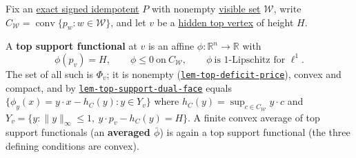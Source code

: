 \hypertarget{def:top-support-functional}{}%
\begin{definition}\label{def:top-support-functional}
Fix an \hyperref[def:signed-idempotent]{exact signed idempotent} $P$ with nonempty
\hyperref[def:visible-set]{visible set} $\mathcal W$, write $C_{\mathcal W}=\operatorname{conv}\{p_w:w\in\mathcal W\}$,
and let $v$ be a \hyperref[def:height]{hidden top vertex} of height $H$.

A \textbf{top support functional} at $v$ is an affine $\phi:\mathbb R^n\to\mathbb R$ with
\[\phi(p_v)=H,\qquad \phi\le 0\ \text{on}\ C_{\mathcal W},\qquad \phi\ \text{is $1$-Lipschitz for }\ell^1.\]
The set of all such is $\Phi_v$; it is nonempty (\hyperlink{dag:lem-top-deficit-price}{\texttt{lem-\allowbreak{}top-\allowbreak{}deficit-\allowbreak{}price}}), convex and compact, and
by \hyperlink{dag:lem-top-support-dual-face}{\texttt{lem-\allowbreak{}top-\allowbreak{}support-\allowbreak{}dual-\allowbreak{}face}} equals $\{\phi_y(x)=y\cdot x-h_{C}(y):y\in Y_v\}$ where
$h_C(y)=\sup_{c\in C_{\mathcal W}}y\cdot c$ and $Y_v=\{y:\lVert y\rVert_\infty\le1,\ y\cdot p_v-h_C(y)=H\}$.
A finite convex average of top support functionals (an \textbf{averaged $\bar\phi$}) is again a top support
functional (the three defining conditions are convex).
\end{definition}
